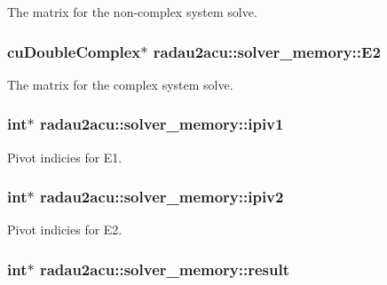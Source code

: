 The matrix for the non-\/complex system solve. 

\subsubsection[{\texorpdfstring{E2}{E2}}]{\setlength{\rightskip}{0pt plus 5cm}cu\+Double\+Complex$\ast$ radau2acu\+::solver\+\_\+memory\+::\+E2}\hypertarget{structradau2acu_1_1solver__memory_a5dd9142fe612186ef7beaaa127d6d833}{}\label{structradau2acu_1_1solver__memory_a5dd9142fe612186ef7beaaa127d6d833}


The matrix for the complex system solve. 

\subsubsection[{\texorpdfstring{ipiv1}{ipiv1}}]{\setlength{\rightskip}{0pt plus 5cm}int$\ast$ radau2acu\+::solver\+\_\+memory\+::ipiv1}\hypertarget{structradau2acu_1_1solver__memory_a308d883e7aadcfff57771ea20135d5de}{}\label{structradau2acu_1_1solver__memory_a308d883e7aadcfff57771ea20135d5de}


Pivot indicies for E1. 

\subsubsection[{\texorpdfstring{ipiv2}{ipiv2}}]{\setlength{\rightskip}{0pt plus 5cm}int$\ast$ radau2acu\+::solver\+\_\+memory\+::ipiv2}\hypertarget{structradau2acu_1_1solver__memory_acea874961a50a0ea2fe6faf2a525f9bc}{}\label{structradau2acu_1_1solver__memory_acea874961a50a0ea2fe6faf2a525f9bc}


Pivot indicies for E2. 

\subsubsection[{\texorpdfstring{result}{result}}]{\setlength{\rightskip}{0pt plus 5cm}int$\ast$ radau2acu\+::solver\+\_\+memory\+::result}\hypertarget{structradau2acu_1_1solver__memory_a4c4c20676cc0589db565d85401f08c22}{}\label{structradau2acu_1_1solver__memory_a4c4c20676cc0589db565d85401f08c22}


